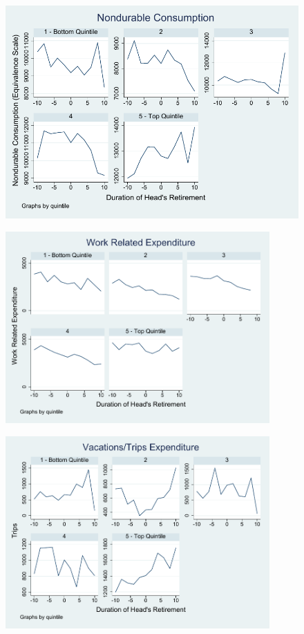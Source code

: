 \documentclass[11pt,onecolumn]{article}
\begin{document}
\begin{figure}[h]
	\centering
	\includegraphics[width=1\textwidth]{../ConsumptionPostRetirement/expenditure_blundell_eq.pdf}
\end{figure}

\begin{figure}[h]
	\centering
	\includegraphics[width=0.9\textwidth]{../ConsumptionPostRetirement/work.pdf}
\end{figure}


\begin{figure}[h]
	\centering
	\includegraphics[width=0.9\textwidth]{../ConsumptionPostRetirement/trips.pdf}
\end{figure}
\end{document}
